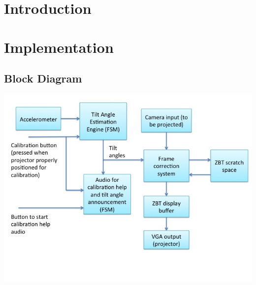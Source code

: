 \documentclass{article}
\begin{document}
\maketitle


\section{Introduction}

\section{Implementation}

\subsection{Block Diagram}
\includegraphics{img/block_diag}
\end{document}
